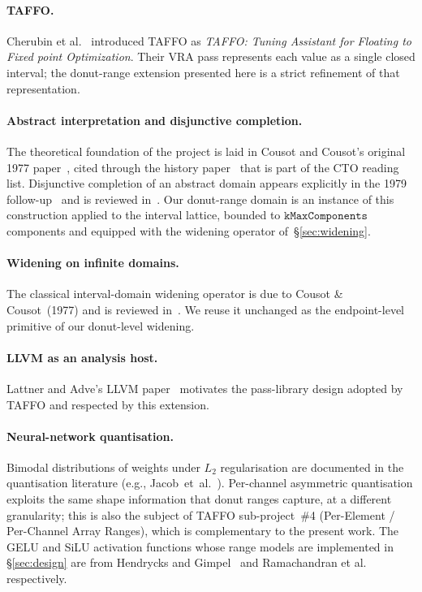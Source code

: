 \documentclass[11pt,a4paper]{article}
\theoremstyle{plain}
\begin{document}
\paragraph{TAFFO.}
Cherubin et al.~\cite{taffo2020} introduced TAFFO as
\emph{TAFFO: Tuning Assistant for Floating to Fixed point
Optimization}. Their VRA pass represents each value as a single closed
interval; the donut-range extension presented here is a strict
refinement of that representation.

\paragraph{Abstract interpretation and disjunctive completion.}
The theoretical foundation of the project is laid in Cousot and
Cousot's original 1977 paper~\cite{cousot77}, cited through the
history paper~\cite{history-ai} that is part of the CTO reading list.
Disjunctive completion of an abstract domain appears explicitly in the
1979 follow-up~\cite{cousot79} and is reviewed
in~\cite[p.~38]{history-ai}. Our donut-range domain is an instance of
this construction applied to the interval lattice, bounded to
$\texttt{kMaxComponents}$ components and equipped with the widening
operator of~\S\ref{sec:widening}.

\paragraph{Widening on infinite domains.}
The classical interval-domain widening operator is due to
Cousot \& Cousot~(1977) and is reviewed in~\cite[p.~36]{history-ai}. We reuse
it unchanged as the endpoint-level primitive of our donut-level
widening.

\paragraph{LLVM as an analysis host.}
Lattner and Adve's LLVM paper~\cite{lattner-llvm} motivates the
pass-library design adopted by TAFFO and respected by this extension.

\paragraph{Neural-network quantisation.}
Bimodal distributions of weights under $L_2$ regularisation are
documented in the quantisation literature
(e.g., Jacob~et~al.~\cite{jacob2018quantization}). Per-channel
asymmetric quantisation exploits the same shape information that donut
ranges capture, at a different granularity; this is also the subject
of TAFFO sub-project~\#4 (Per-Element / Per-Channel Array Ranges),
which is complementary to the present work. The GELU and SiLU
activation functions whose range models are implemented in
\S\ref{sec:design} are from Hendrycks and Gimpel~\cite{gelu} and
Ramachandran et al.~\cite{swish} respectively.
\end{document}
